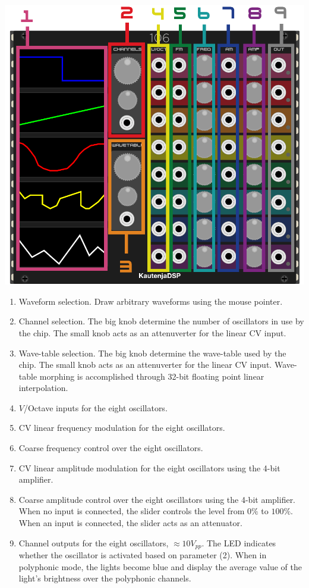 \documentclass[12pt,a4paper]{article}
\begin{document}
\begin{center}
\includegraphics{106-Manual}
\end{center}

\begin{enumerate}
  \item Waveform selection. Draw arbitrary waveforms using the mouse pointer.
  \item Channel selection. The big knob determine the number of oscillators in use by the chip. The small knob acts as an attenuverter for the linear CV input.
  \item Wave-table selection. The big knob determine the wave-table used by the chip. The small knob acts as an attenuverter for the linear CV input. Wave-table morphing is accomplished through 32-bit floating point linear interpolation.
  \item $V$/Octave inputs for the eight oscillators.
  \item CV linear frequency modulation for the eight oscillators.
  \item Coarse frequency control over the eight oscillators.
  \item CV linear amplitude modulation for the eight oscillators using the 4-bit amplifier.
  \item Coarse amplitude control over the eight oscillators using the 4-bit amplifier. When no input is connected, the slider controls the level from $0\%$ to $100\%$. When an input is connected, the slider acts as an attenuator.
  \item Channel outputs for the eight oscillators, ${\approx}10V_{pp}$. The LED indicates whether the oscillator is activated based on parameter (2). When in polyphonic mode, the lights become blue and display the average value of the light's brightness over the polyphonic channels.
\end{enumerate}


\clearpage
\renewcommand\refname{References \& Acknowledgments}
\nocite{*}


\end{document}

